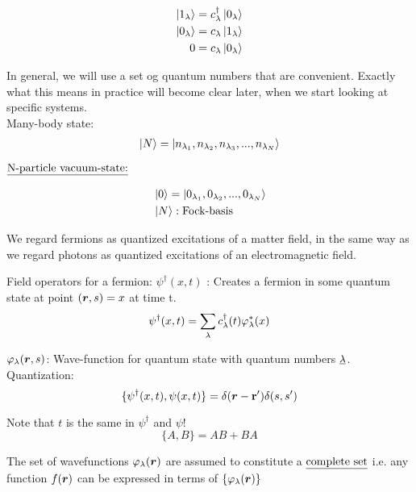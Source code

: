 \begin{align*}
	\ket{1_\lambda} &= c^{\dagger}_\lambda \ket{0_\lambda}\\
	\ket{0_\lambda} &= c_\lambda \ket{1_\lambda}\\
	0 &= c_\lambda \ket{0_\lambda}
\end{align*}

\noindent In general, we will use a set og quantum numbers that are convenient. Exactly what this means in practice will become clear later, when we start looking at specific systems.\\

\noindent Many-body state:
\begin{align*}
	\ket{N}= \ket{ n_{\lambda_1}, n_{\lambda_2} ,n_{\lambda_3} ,...,  n_{\lambda_N}} 
\end{align*}

\noindent $\emph{\text{N-particle vacuum-state:}}$

\begin{align}
	&\ket{0} = \ket{0_{\lambda_1},0_{\lambda_2},...,0_{\lambda_N}}\\
	&\ket{N} : \text{Fock-basis} \nonumber
\end{align}

\noindent We regard fermions as quantized excitations of a matter field, in the same way as we regard photons as quantized excitations of an electromagnetic field.

Field operators for a fermion: $\psi^\dagger(x,t)$ : Creates a fermion in some quantum state at point $(\bm{r},s)=x$ at time t.
\begin{equation}
	\psi^\dagger(x,t)= \sum_\lambda c^{\dagger}_\lambda(t) \varphi_\lambda^*(x)
\end{equation}

\noindent $\varphi_\lambda(\bm{r},s)$: Wave-function for quantum state with quantum numbers $\emph{\lambda}$.\\

\noindent Quantization:
\begin{equation}
	\{\psi^\dagger (x,t), \psi(x,t) \}= \delta(\bm{r}-\vb{r'}) \delta(s,s')
\end{equation}

Note that $t$ is the same in $\psi^\dagger$ and $\psi$!
\begin{equation}
	\{A,B\}= AB+BA
\end{equation}

\noindent The set of wavefunctions $\varphi_\lambda(\bm{r})$ are assumed to constitute a $\emph{\text{complete set}}$ i.e. any function $f(\bm{r})$ can be expressed in terms of $\{\varphi_\lambda(\bm{r})\}$


